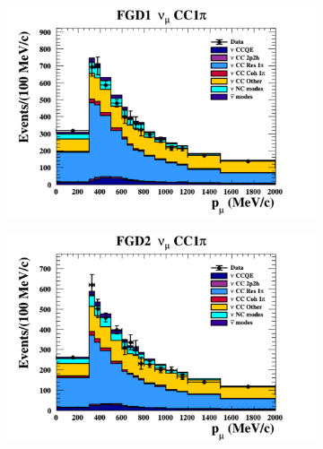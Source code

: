 \begin{figure}[h]
\begin{subfigure}[t]{0.49\textwidth}
    \includegraphics[width=\textwidth, trim={0mm 0mm 0mm 0mm}, clip,page=1]{Figures/Selections/Pmu_1D_modes_FGD1_numuCC_1pi_Data_prefit.pdf}
  \end{subfigure}%
  \begin{subfigure}[t]{0.49\textwidth}
    \includegraphics[width=\textwidth, trim={0mm 0mm 0mm 0mm}, clip,page=1]{Figures/Selections/Pmu_1D_modes_FGD2_numuCC_1pi_Data_prefit.pdf}
  \end{subfigure}
  \begin{subfigure}[t]{0.49\textwidth}

\end{subfigure}
\end{figure}

